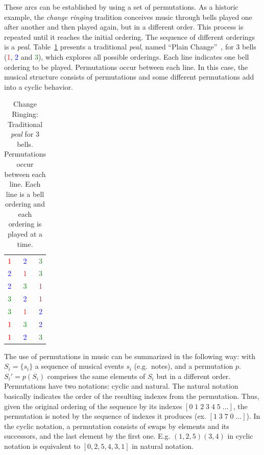 These arcs can be established by using a set of permutations. As a historic
example, the \emph{change ringing} tradition conceives music through
bells played one after another and then played again, but in a different
order. This process is repeated until it reaches the initial ordering. The sequence of
different orderings is a \emph{peal}. Table~\ref{tab:change}
presents a traditional \emph{peal}, named ``Plain Change''~\cite{change}, for 3 bells (\textcolor{red}{1}, \textcolor{blue}{2} and \textcolor{green}{3}), which explores
all possible orderings. Each line indicates one bell ordering to be
played. Permutations occur between each line. In this case, the musical structure
consists of permutations and some different permutations add into a
cyclic behavior.

\begin{table}[htp!]
\centering
\caption{Change Ringing: Traditional \emph{peal} for 3 bells. Permutations
occur between each line. Each line is a bell ordering and each ordering is played at a time.} 
\begin{tabular}{l c r}
\textcolor{red}{1} & \textcolor{blue}{2} & \textcolor{green}{3} \\
\textcolor{blue}{2} & \textcolor{red}{1} & \textcolor{green}{3} \\
\textcolor{blue}{2} & \textcolor{green}{3} & \textcolor{red}{1} \\
\textcolor{green}{3} & \textcolor{blue}{2} & \textcolor{red}{1} \\
\textcolor{green}{3} & \textcolor{red}{1} & \textcolor{blue}{2} \\
\textcolor{red}{1} & \textcolor{green}{3} & \textcolor{blue}{2} \\
\textcolor{red}{1} & \textcolor{blue}{2} & \textcolor{green}{3}
\end{tabular}
\label{tab:change}
\end{table}

The use of permutations in music can be summarized in the following way:
with $S_i=\{s_i\}$ a sequence of musical events $s_i$ (e.g.\ notes), and a
permutation $p$. $S_i'=p(S_i)$ comprises the same elements of $S_i$ but in a
different order. Permutations have two notations: cyclic and
natural. The natural notation basically indicates the order of the resulting indexes from
the permutation. Thus, given the original ordering of the sequence by its indexes $[0\;1\;2\;3\;4\;5\;...]$, the permutation is noted by the sequence of indexes it
produces (ex. $[1\;3\;7\;0\;...]$). In the cyclic notation, a permutation consists
of swaps by elements and its successors, and the last element by the first one.
E.g. $(1,2,5)(3,4)$ in cyclic notation is equivalent to $[0,2,5,4,3,1]$ in natural notation.

